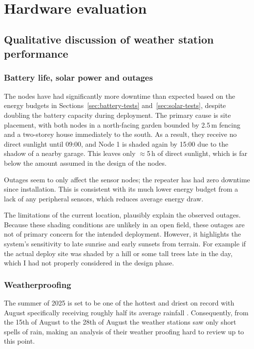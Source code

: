 \section{Hardware evaluation}

\subsection{Qualitative discussion of weather station performance}

\subsubsection{Battery life, solar power and outages}

The nodes have had significantly more downtime than expected based on the energy
budgets in Sections~\ref{sec:battery-tests} and~\ref{sec:solar-tests}, despite
doubling the battery capacity during deployment. The primary cause is site
placement, with both nodes in a north-facing garden bounded by 2.5\,m fencing
and a two-storey house immediately to the south. As a result, they receive no
direct sunlight until 09:00, and Node 1 is shaded again by 15:00 due to the
shadow of a nearby garage. This leaves only \(\approx\)5\,h of direct sunlight,
which is far below the amount assumed in the design of the nodes.

Outages seem to only affect the sensor nodes; the repeater has had zero downtime
since installation. This is consistent with its much lower energy budget from a
lack of any peripheral sensors, which reduces average energy draw.

The limitations of the current location, plausibly explain the observed outages.
Because these shading conditions are unlikely in an open field, these outages
are not of primary concern for the intended deployment. However, it highlights
the system's sensitivity to late sunrise and early sunsets from terrain. For
example if the actual deploy site was shaded by a hill or some tall trees late
in the day, which I had not properly considered in the design phase.

\subsubsection{Weatherproofing}

The summer of 2025 is set to be one of the hottest and driest on record with
August specifically receiving roughly half its average rainfall
\cite{uor2025summer}. Consequently, from the 15th of August to the 28th of
August the weather stations saw only short spells of rain, making an analysis of
their weather proofing hard to review up to this point. 

